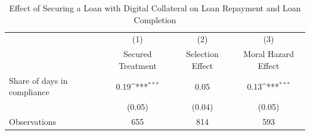 \begin{table}[htbp]\centering
\def\sym#1{\ifmmode^{#1}\else\(^{#1}\)\fi}
\caption{Effect of Securing a Loan with Digital Collateral on Loan Repayment and Loan Completion\label{LASMH\_complete\_LATE\_200}}
\begin{tabular}{l*{3}{c}}
\toprule
                    &\multicolumn{1}{c}{(1)}&\multicolumn{1}{c}{(2)}&\multicolumn{1}{c}{(3)}\\
                    &\multicolumn{1}{c}{Secured Treatment}&\multicolumn{1}{c}{Selection Effect}&\multicolumn{1}{c}{Moral Hazard Effect}\\
\midrule
Share of days in compliance&        0.19\sym{***}&        0.05         &        0.13\sym{***}\\
                    &      (0.05)         &      (0.04)         &      (0.05)         \\
\midrule
Observations        &         655         &         814         &         593         \\
\bottomrule
\end{tabular}
\end{table}
